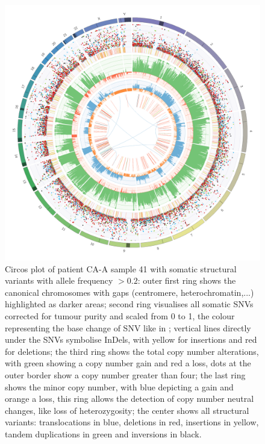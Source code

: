\begin{figure}[!ht]
\centering
\includegraphics[width=.99\linewidth]{Figures/CASCADE/CA99/CA99-41.circos.png}
\caption[Circos plot of patient CA-A sample 41]{Circos plot of patient CA-A sample 41 with somatic structural variants with allele frequency $> 0.2$: outer first ring shows the canonical chromosomes with gaps (centromere, heterochromatin,...) highlighted as darker areas; second ring visualises all somatic SNVs corrected for tumour purity and scaled from 0 to 1, the colour representing the base change of SNV like in \protect\textcite{Alexandrov2013}; vertical lines directly under the SNVs symbolise InDels, with yellow for insertions and red for deletions; the third ring shows the total copy number alterations, with green showing a copy number gain and red a loss, dots at the outer border show a copy number greater than four; the last ring shows the minor copy number, with blue depicting a gain and orange a loss, this ring allows the detection of copy number neutral changes, like loss of heterozygosity; the center shows all structural variants: translocations in blue, deletions in red, insertions in yellow, tandem duplications in green and inversions in black.} \label{fig:ca99.41circos}
\end{figure}



